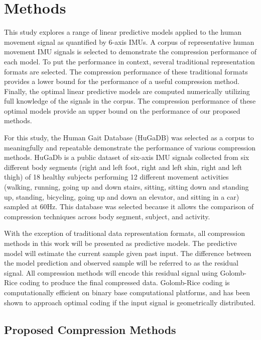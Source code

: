 \documentclass[journal]{IEEEtran}
\begin{document}
\section{Methods}
This study explores a range of linear predictive models applied to the human movement signal as quantified by 6-axis IMUs. A corpus of representative human movement IMU signals is selected to demonstrate the compression performance of each model. To put the performance in context, several traditional representation formats are selected. The compression performance of these traditional formats provides a lower bound for the performance of a useful compression method. Finally, the optimal linear predictive models are computed numerically utilizing full knowledge of the signals in the corpus. The compression performance of these optimal models provide an upper bound on the performance of our proposed methods.

For this study, the Human Gait Database (HuGaDB)\cite{Chereshnev2018} was selected as a corpus to meaningfully and repeatable demonstrate the performance of various compression methods. HuGaDb is a public dataset of six-axis IMU signals collected from six different body segments (right and left foot, right and left shin, right and left thigh) of 18 healthy subjects performing 12 different movement activities (walking, running, going up and down stairs, sitting, sitting down and standing up, standing, bicycling, going up and down an elevator, and sitting in a car) sampled at 60Hz. This database was selected because it allows the comparison of compression techniques across body segment, subject, and activity.

With the exception of traditional data representation formats, all compression methods in this work will be presented as predictive models. The predictive model will estimate the current sample given past input. The difference between the model prediction and observed sample will be referred to as the residual signal. All compression methods will encode this residual signal using Golomb-Rice coding to produce the final compressed data. Golomb-Rice coding is computationally efficient on binary base computational platforms, and has been shown to approach optimal coding if the input signal is geometrically distributed\cite{Golomb1966}\cite{F.Rice1979}.

\subsection{Proposed Compression Methods}
\end{document}
